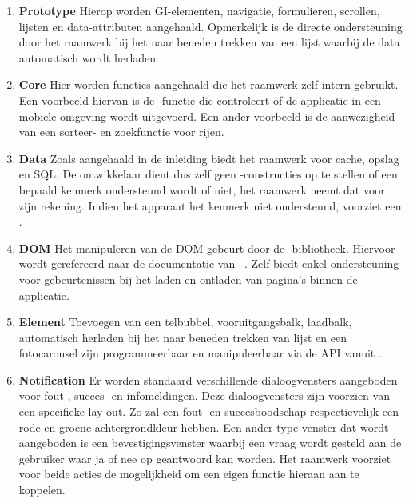 \begin{enumerate}

\item \textbf{Prototype} 
Hierop worden GI-elementen, navigatie, formulieren, scrollen, lijsten en data-attributen aangehaald. 
Opmerkelijk is de directe ondersteuning door het raamwerk bij het naar beneden trekken van een lijst waarbij de data automatisch wordt herladen.

\item \textbf{Core }
Hier worden functies aangehaald die het raamwerk zelf intern gebruikt.
Een voorbeeld hiervan is de -functie die controleert of de applicatie in een mobiele omgeving wordt uitgevoerd.
Een ander voorbeeld is de aanwezigheid van een sorteer- en zoekfunctie voor rijen.

\item \textbf{Data }
Zoals aangehaald in de inleiding biedt het raamwerk  voor cache, opslag en SQL.
De ontwikkelaar dient dus zelf geen -constructies op te stellen of een bepaald kenmerk ondersteund wordt of niet, het raamwerk neemt dat voor zijn rekening.
Indien het apparaat het kenmerk niet ondersteund, voorziet \lungo{} een .

\item \textbf{DOM }
Het manipuleren van de DOM gebeurt door de \quo{}-bibliotheek.
Hiervoor wordt gerefereerd naar de documentatie van \quo{}~\cite{TapQuo2013c}.
Zelf biedt \lungo{} enkel ondersteuning voor gebeurtenissen bij het laden en ontladen van pagina's binnen de applicatie.

\item \textbf{Element }
Toevoegen van een telbubbel, vooruitgangsbalk, laadbalk, automatisch herladen bij het naar beneden trekken van lijst en een fotocarousel zijn programmeerbaar en manipuleerbaar via de \lungo{} API vanuit \js{}. 

\item \textbf{Notification }
Er worden standaard verschillende dialoogvensters aangeboden voor fout-, succes- en infomeldingen.
Deze dialoogvensters zijn voorzien van een specifieke lay-out.
Zo zal een fout- en succesboodschap respectievelijk een rode en groene achtergrondkleur hebben.
Een ander type venster dat wordt aangeboden is een bevestigingsvenster waarbij een vraag wordt gesteld aan de gebruiker waar ja of nee op geantwoord kan worden.
Het raamwerk voorziet voor beide acties de mogelijkheid om een eigen functie hieraan aan te koppelen.
 

\end{enumerate}
